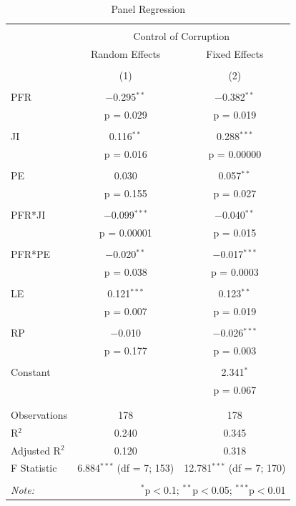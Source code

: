 \documentclass[12,twoside]{article}
\begin{document}
\begin{table}[!htbp] \centering 
  \caption{Panel Regression} 
  \label{} 
\begin{tabular}{@{\extracolsep{5pt}}lcc} 
\\[-1.8ex]\hline 
\hline \\[-1.8ex] 
 & \multicolumn{2}{c}{Control of Corruption} \\ 
\cline{2-3} 
 & Random Effects & Fixed Effects \\ 
\\[-1.8ex] & (1) & (2)\\ 
\hline \\[-1.8ex] 
 PFR & $-$0.295$^{**}$ & $-$0.382$^{**}$ \\ 
  & p = 0.029 & p = 0.019 \\ 
  & & \\ 
 JI & 0.116$^{**}$ & 0.288$^{***}$ \\ 
  & p = 0.016 & p = 0.00000 \\ 
  & & \\ 
 PE & 0.030 & 0.057$^{**}$ \\ 
  & p = 0.155 & p = 0.027 \\ 
  & & \\ 
 PFR*JI & $-$0.099$^{***}$ & $-$0.040$^{**}$ \\ 
  & p = 0.00001 & p = 0.015 \\ 
  & & \\ 
 PFR*PE & $-$0.020$^{**}$ & $-$0.017$^{***}$ \\ 
  & p = 0.038 & p = 0.0003 \\ 
  & & \\ 
 LE & 0.121$^{***}$ & 0.123$^{**}$ \\ 
  & p = 0.007 & p = 0.019 \\ 
  & & \\ 
 RP & $-$0.010 & $-$0.026$^{***}$ \\ 
  & p = 0.177 & p = 0.003 \\ 
  & & \\ 
 Constant &  & 2.341$^{*}$ \\ 
  &  & p = 0.067 \\ 
  & & \\ 
\hline \\[-1.8ex] 
Observations & 178 & 178 \\ 
R$^{2}$ & 0.240 & 0.345 \\ 
Adjusted R$^{2}$ & 0.120 & 0.318 \\ 
F Statistic & 6.884$^{***}$ (df = 7; 153) & 12.781$^{***}$ (df = 7; 170) \\ 
\hline 
\hline \\[-1.8ex] 
\textit{Note:}  & \multicolumn{2}{r}{$^{*}$p$<$0.1; $^{**}$p$<$0.05; $^{***}$p$<$0.01} \\ 
\end{tabular} 
\end{table}
\end{document}
